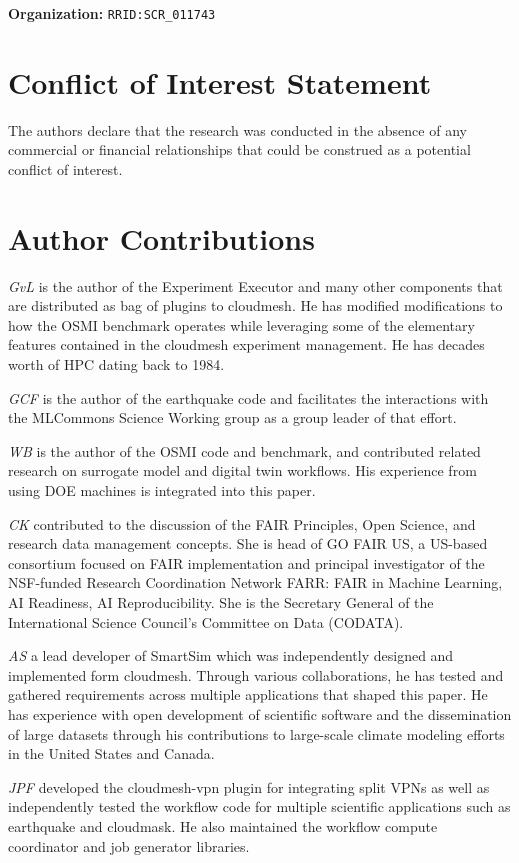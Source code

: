 \documentclass[utf8]{FrontiersinVancouver} %
\begin{document}
{\bf Organization:} \verb|RRID:SCR_011743|

\section*{Conflict of Interest Statement}

The authors declare that the research was conducted in the absence of any commercial or financial relationships that could be construed as a potential conflict of interest.

\section*{Author Contributions}

{\em GvL} is the author of the Experiment Executor and many other components that are distributed as bag of plugins to cloudmesh.  He has modified modifications to how the OSMI benchmark operates while leveraging some of the elementary features contained in the cloudmesh experiment management. He has decades worth of HPC dating back to 1984. 

{\em GCF} is the author of the earthquake code and facilitates the interactions with the MLCommons Science Working group as a group leader of that effort. 


{\em WB} is the author of the OSMI code and benchmark, and contributed related research on surrogate model and digital twin workflows. His experience from using DOE machines is integrated into this paper.

{\em CK} contributed to the discussion of the FAIR Principles, Open Science, and research data management concepts. She is head of GO FAIR US, a US-based consortium focused on FAIR implementation and principal investigator of the NSF-funded Research Coordination Network FARR: FAIR in Machine Learning, AI Readiness, AI Reproducibility. She is the Secretary General of the International Science Council's Committee on Data (CODATA).

{\em AS} a lead developer of SmartSim which was independently designed and implemented form cloudmesh. Through various collaborations, he has tested and gathered requirements across multiple applications that shaped this paper. He has experience with open development of scientific software and the dissemination of large datasets through his contributions to large-scale climate modeling efforts in the United States and Canada. 

{\em JPF} developed the cloudmesh-vpn plugin for integrating split VPNs as well as independently tested the workflow code for multiple scientific applications such as earthquake and cloudmask. He also maintained the workflow compute coordinator and job generator libraries.
\end{document}
